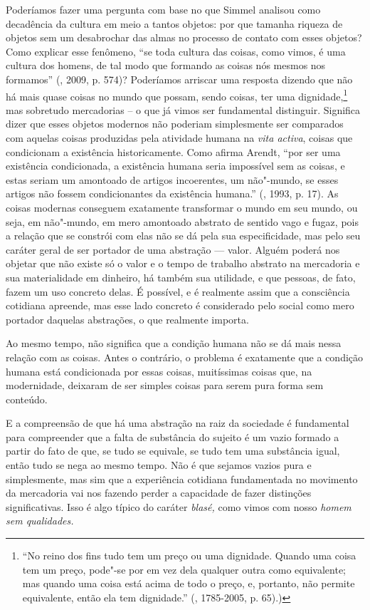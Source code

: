 {Poderíamos fazer uma pergunta com base no que Simmel analisou como
decadência da cultura em meio a tantos objetos: por que tamanha riqueza
de objetos sem um desabrochar das almas no processo de contato com esses
objetos? Como explicar esse fenômeno, ``se toda cultura das coisas, como
vimos, é uma cultura dos homens, de tal modo que formando as coisas nós
mesmos nos formamos'' (, 2009, p. 574)? Poderíamos
arriscar uma resposta dizendo que não há mais quase coisas no mundo que
possam, sendo coisas, ter uma dignidade,\footnote{``No reino dos fins
  tudo tem um preço ou uma dignidade. Quando uma coisa tem um preço,
  pode"-se por em vez dela qualquer outra como equivalente; mas quando
  uma coisa está acima de todo o preço, e, portanto, não permite
  equivalente, então ela tem dignidade.'' (, 1785-2005, p. 65).)}
mas sobretudo mercadorias -- o que já vimos ser fundamental distinguir.
Significa dizer que esses objetos modernos não poderiam simplesmente ser
comparados com aquelas coisas produzidas pela atividade humana na
\emph{vita activa}, coisas que condicionam a existência historicamente.
Como afirma Arendt, ``por ser uma existência condicionada, a existência
humana seria impossível sem as coisas, e estas seriam um amontoado de
artigos incoerentes, um não"-mundo, se esses artigos não fossem
condicionantes da existência humana.'' (, 1993, p. 17). As coisas
modernas conseguem exatamente transformar o mundo em seu mundo, ou seja,
em não"-mundo, em mero amontoado abstrato de sentido vago e fugaz, pois a
relação que se constrói com elas não se dá pela sua especificidade, mas
pelo seu caráter geral de ser portador de uma abstração --- valor.
Alguém poderá nos objetar que não existe só o valor e o tempo de
trabalho abstrato na mercadoria e sua materialidade em dinheiro, há
também sua utilidade, e que pessoas, de fato, fazem um uso concreto
delas. É possível, e é realmente assim que a consciência cotidiana
apreende, mas esse lado concreto é considerado pelo social como mero
portador daquelas abstrações, o que realmente importa.

Ao mesmo tempo, não significa que a condição humana não se dá mais nessa
relação com as coisas. Antes o contrário, o problema é exatamente que a
condição humana está condicionada por essas coisas, muitíssimas coisas
que, na modernidade, deixaram de ser simples coisas para serem pura
forma sem conteúdo.

E a compreensão de que há uma abstração na raiz da sociedade é
fundamental para compreender que a falta de substância do sujeito é um
vazio formado a partir do fato de que, se tudo se equivale, se tudo tem
uma substância igual, então tudo se nega ao mesmo tempo. Não é que
sejamos vazios pura e simplesmente, mas sim que a experiência cotidiana
fundamentada no movimento da mercadoria vai nos fazendo perder a
capacidade de fazer distinções significativas. Isso é algo típico do
caráter \emph{blasé,} como vimos com nosso \emph{homem sem qualidades.}

}
